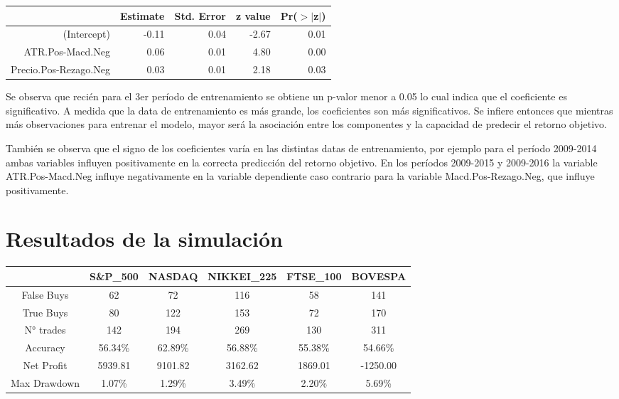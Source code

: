 \documentclass[a4paper,12pt]{Latex/Classes/PhDthesisPSnPDF}
\begin{document}
\begin{center}
\begin{table}[ht]
\centering
\begin{tabular}{rrrrr}
  \hline
 & Estimate & Std. Error & z value & Pr($>$$|$z$|$) \\ 
  \hline
(Intercept) & -0.11 & 0.04 & -2.67 & 0.01 \\ 
  ATR.Pos-Macd.Neg & 0.06 & 0.01 & 4.80 & 0.00 \\ 
  Precio.Pos-Rezago.Neg & 0.03 & 0.01 & 2.18 & 0.03 \\ 
   \hline
\end{tabular}
\end{table}\end{center}

Se observa que recién para el 3er período de entrenamiento se obtiene un p-valor menor a 0.05 lo cual indica que el coeficiente es significativo. A medida que la data de entrenamiento es más grande, los coeficientes son más significativos. Se infiere entonces que mientras más observaciones para entrenar el modelo, mayor será la asociación entre los componentes y la capacidad de predecir el retorno objetivo.

También se observa que el signo de los coeficientes varía en las distintas datas de entrenamiento, por ejemplo para el período 2009-2014 ambas variables influyen positivamente en la correcta predicción del retorno objetivo. En los períodos 2009-2015 y 2009-2016 la variable ATR.Pos-Macd.Neg influye negativamente en la variable dependiente caso contrario para la variable Macd.Pos-Rezago.Neg, que influye positivamente.

\section{Resultados de la simulación}


\begin{center}
\begin{table}[ht]
\centering
\begin{tabular}{cccccc}
  \hline
 & S\&P\_500 & NASDAQ & NIKKEI\_225 & FTSE\_100 & BOVESPA \\ 
  \hline
False Buys & 62 & 72 & 116 & 58 & 141 \\ 
  True Buys & 80 & 122 & 153 & 72 & 170 \\ 
  N° trades & 142 & 194 & 269 & 130 & 311 \\ 
  Accuracy & 56.34\% & 62.89\% & 56.88\% & 55.38\% & 54.66\% \\ 
  Net Profit & 5939.81 & 9101.82 & 3162.62 & 1869.01 & -1250.00 \\ 
  Max Drawdown & 1.07\% & 1.29\% & 3.49\% & 2.20\% & 5.69\% \\ 
   \hline
\end{tabular}
\end{table}\end{center}
\end{document}
